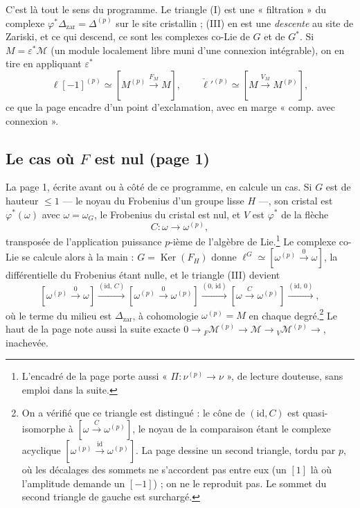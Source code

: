 \documentclass[11pt,a4paper]{article}
\begin{document}
C'est là tout le sens du programme. Le triangle (I) est une « filtration »
du complexe $\varphi^{*}\Delta_{\mathrm{zar}} = \Delta^{(p)}$ sur le site
cristallin ; (III) en est une \emph{descente} au site de Zariski, et ce qui
descend, ce sont les complexes co-Lie de $G$ et de $G^{*}$. Si $M =
\varepsilon^{*}\mathcal{M}$ (un module localement libre muni d'une connexion
intégrable), on en tire en appliquant $\varepsilon^{*}$
\[
\ell[-1]^{(p)} \simeq [M^{(p)} \xrightarrow{F_{M}} M], \qquad
\check\ell'^{(p)} \simeq [M \xrightarrow{V_{M}} M^{(p)}],
\]
ce que la page encadre d'un point d'exclamation, avec en marge « comp. avec
connexion ».

\subsection*{Le cas où $F$ est nul (page 1)}

La page 1, écrite avant ou à côté de ce programme, en calcule un cas. Si $G$
est de hauteur $\le 1$ — le noyau du Frobenius d'un groupe lisse $H$ —, son
cristal est $\varphi^{*}(\omega)$ avec $\omega = \omega_{G}$, le Frobenius
du cristal est nul, et $V$ est $\varphi^{*}$ de la flèche
\[
C\colon \omega \longrightarrow \omega^{(p)},
\]
transposée de l'application puissance $p$-ième de l'algèbre de Lie.\footnote{L'encadré
de la page porte aussi « $\Pi\colon \nu^{(p)} \to \nu$ », de lecture
douteuse, sans emploi dans la suite.} Le complexe co-Lie se calcule alors à
la main : $G = \operatorname{Ker}(F_{H})$ donne
$\ell^{G} \simeq [\omega^{(p)} \xrightarrow{0} \omega]$, la différentielle du
Frobenius étant nulle, et le triangle (III) devient
\[
[\omega^{(p)} \xrightarrow{0} \omega]
\xrightarrow{(\mathrm{id},\,C)}
[\omega^{(p)} \xrightarrow{0} \omega^{(p)}]
\xrightarrow{(0,\,\mathrm{id})}
[\omega \xrightarrow{C} \omega^{(p)}]
\xrightarrow{(\mathrm{id},\,0)} ,
\]
où le terme du milieu est $\Delta_{\mathrm{zar}}$, à cohomologie $\omega^{(p)}
= M$ en chaque degré.\footnote{On a vérifié que ce triangle est distingué :
le cône de $(\mathrm{id}, C)$ est quasi-isomorphe à
$[\omega \xrightarrow{C} \omega^{(p)}]$, le noyau de la comparaison étant le
complexe acyclique $[\omega^{(p)} \xrightarrow{\mathrm{id}} \omega^{(p)}]$.
La page dessine un second triangle, tordu par $p$, où les décalages des
sommets ne s'accordent pas entre eux (un $[1]$ là où l'amplitude demande un
$[-1]$) ; on ne le reproduit pas. Le sommet du second triangle de gauche est
surchargé.} Le haut de la page note aussi la suite exacte
$0 \to {}_{F}\mathcal{M}^{(p)} \to \mathcal{M} \to {}_{V}\mathcal{M}^{(p)}
\to$, inachevée.
\end{document}
